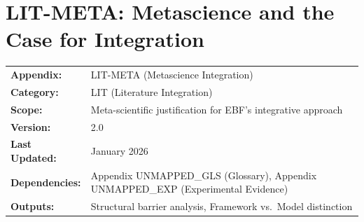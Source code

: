 %
%
%
%
%

\chapter{LIT-META: Metascience and the Case for Integration}
\label{app:lit-meta}


\begin{tcolorbox}[colback=orange!5!white, colframe=orange!75!black,
    title=\textbf{Appendix UNMAPPED_MSC: Literature Integration}]

\begin{tabular}{@{}ll@{}}
\textbf{Appendix:} & LIT-META (Metascience Integration) \\
\textbf{Category:} & LIT (Literature Integration) \\
\textbf{Scope:} & Meta-scientific justification for EBF's integrative approach \\
\textbf{Version:} & 2.0 \\
\textbf{Last Updated:} & January 2026 \\
\textbf{Dependencies:} & Appendix UNMAPPED_GLS (Glossary), Appendix UNMAPPED_EXP (Experimental Evidence) \\
\textbf{Outputs:} & Structural barrier analysis, Framework vs.\ Model distinction \\
\end{tabular}

\end{tcolorbox}


